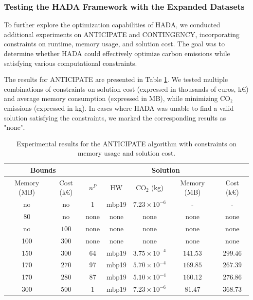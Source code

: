 \documentclass[a4paper,singleside,12pt]{report} %
\begin{document}
\subsubsection{Testing the HADA Framework with the Expanded Datasets}

To further explore the optimization capabilities of HADA, we conducted additional experiments on ANTICIPATE and CONTINGENCY, incorporating constraints on runtime, memory usage, and 
solution cost. The goal was to determine whether HADA could effectively optimize carbon emissions while satisfying various computational constraints. 

The results for ANTICIPATE are presented in Table \ref{tab:anticipate_results}. We tested multiple combinations of constraints on solution cost (expressed in thousands of euros, k€) and 
average memory consumption (expressed in MB), while minimizing CO₂ emissions (expressed in kg). In cases where HADA was unable to find a valid solution satisfying the constraints, we 
marked the corresponding results as "none".

\begin{table}[h!]
    \centering
    \begin{tabular}{|cc|ccccc|}
        \hline
        \multicolumn{2}{|c|}{Bounds} & \multicolumn{5}{c|}{Solution} \\
        \hline
        Memory (MB) & Cost (k€) & $n^P$ & HW & CO$_2$ (kg) & Memory (MB) & Cost (k€) \\
        \hline
        no & no & 1 & mbp19 & $7.23 \times 10^{-6}$ & - & - \\
        80 & no & none & none & none & none & none \\
        no & $100$ & none & none & none & none & none \\
        100 & $300$ & none & none & none & none & none \\
        150 & $300$ & 64 & mbp19 & $3.75 \times 10^{-4}$ & $141.53$ & $299.46$ \\
        170 & $270$ & 97 & mbp19 & $5.70 \times 10^{-4}$ & $169.85$ & $267.39$ \\
        170 & $280$ & 87 & mbp19 & $5.10 \times 10^{-4}$ & $160.12$ & $276.86$ \\
        300 & $500$ & 1 & mbp19 & $7.23 \times 10^{-6}$ & $81.47$ & $368.73$ \\
        \hline
    \end{tabular}
    \caption{Experimental results for the ANTICIPATE algorithm with constraints on memory usage and solution cost.}
    \label{tab:anticipate_results}
\end{table}
\end{document}
